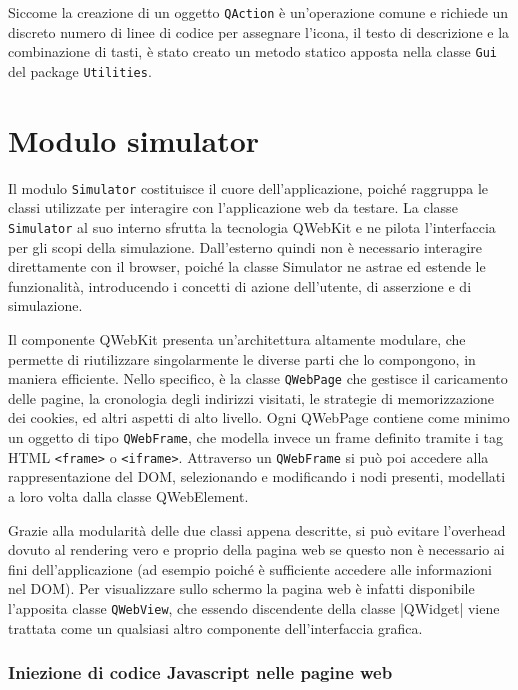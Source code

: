\documentclass[12pt]{toptesi}
\begin{document}
Siccome la creazione di un oggetto \verb|QAction| è un'operazione comune e richiede un discreto numero di linee di codice per assegnare l'icona, il testo di descrizione e la combinazione di tasti, è stato creato un metodo statico apposta nella classe \verb|Gui| del package \verb|Utilities|.

\section{Modulo simulator}

Il modulo \verb|Simulator| costituisce il cuore dell'applicazione, poiché raggruppa le classi utilizzate per interagire con l'applicazione web da testare. La classe \verb|Simulator| al suo interno sfrutta la tecnologia QWebKit e ne pilota l'interfaccia per gli scopi della simulazione. Dall'esterno quindi non è necessario interagire direttamente con il browser, poiché la classe Simulator ne astrae ed estende le funzionalità, introducendo i concetti di azione dell'utente, di asserzione e di simulazione.

Il componente QWebKit presenta un'architettura altamente modulare, che permette di riutilizzare singolarmente le diverse parti che lo compongono, in maniera efficiente. Nello specifico, è la classe \verb|QWebPage| che gestisce il caricamento delle pagine, la cronologia degli indirizzi visitati, le strategie di memorizzazione dei cookies, ed altri aspetti di alto livello. Ogni QWebPage contiene come minimo un oggetto di tipo \verb|QWebFrame|, che modella invece un frame definito tramite i tag HTML \verb|<frame>| o \verb|<iframe>|. Attraverso un \verb|QWebFrame| si può poi accedere alla rappresentazione del DOM, selezionando e modificando i nodi presenti, modellati a loro volta dalla classe QWebElement. 

Grazie alla modularità delle due classi appena descritte, si può evitare l'overhead dovuto al rendering vero e proprio della pagina web se questo non è necessario ai fini dell'applicazione (ad esempio poiché è sufficiente accedere alle informazioni nel DOM). Per visualizzare sullo schermo la pagina web è infatti disponibile l'apposita classe \verb|QWebView|, che essendo discendente della classe |QWidget| viene trattata come un qualsiasi altro componente dell'interfaccia grafica.

\subsubsection{Iniezione di codice Javascript nelle pagine web}
\end{document}
